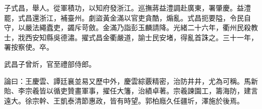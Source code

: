 \begin{pinyinscope}
子式昌，舉人。從軍積功，以知府發浙江。巡撫蔣益澧調赴廣東，署肇慶。益澧罷，式昌還浙江，補臺州。劇盜黃金滿以官吏貪酷，煽亂。式昌扼要隘，令民自守，以嚴法繩蠹吏，蠲斥苛斂。金滿乃詣彭玉麟請降。光緒二十六年，衢州民殺教士，戕西安知縣吳德潚。擢式昌金衢嚴道，諭士民安堵，得亂首誅之。三十一年，署按察使。卒。

武昌子曾炘，官至禮部侍郎。

論曰：王慶雲、譚廷襄並易又歷中外，慶雲綜覈精密，治防井井，尤為可稱。馬新貽、李宗羲皆以循吏贊畫軍事，擢任大籓，治績卓著。宗羲諫園工，籌海防，建言遠大。徐宗幹、王凱泰清節惠政，皆有時望。郭柏廕久任疆圻，澤施於後焉。


\end{pinyinscope}